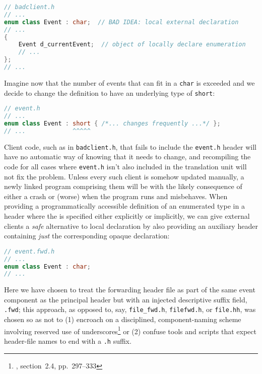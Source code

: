 \begin{lstlisting}[language=C++]
// badclient.h
// ...
enum class Event : char;  // BAD IDEA: local external declaration
// ...
{
    Event d_currentEvent;  // object of locally declare enumeration
    // ...
};
// ...
\end{lstlisting}

\noindent Imagine now that the number of events that can fit in a \lstinline!char! is
exceeded and we decide to change the definition to have an underlying
type of \lstinline!short!:

\begin{lstlisting}[language=C++]
// event.h
// ...
enum class Event : short { /*... changes frequently ...*/ };
// ...             ^^^^^
\end{lstlisting}

\noindent Client code, such as in \lstinline!badclient.h!, that fails to include the
\lstinline!event.h! header will have no automatic way of knowing that it
needs to change, and recompiling the code for all cases where
\lstinline!event.h! isn't also included in the translation unit will not
fix the problem. Unless every such client is somehow updated manually, a
newly linked program comprising them will be \romeogloss{IFNDR} with the likely
consequence of either a crash or (worse) when the program runs and
misbehaves. When providing a programmatically accessible definition of
an enumerated type in a header where the \romeogloss{underlying type} is
specified either explicitly or implicitly, we can give external
clients a \emph{safe} alternative to local declaration by also providing
an auxiliary header containing \emph{just} the corresponding opaque
declaration:

\begin{lstlisting}[language=C++]
// event.fwd.h
// ...
enum class Event : char;
// ...
\end{lstlisting}

\noindent Here we have chosen to treat the forwarding header file as part of the same event component as the principal header but with an injected descriptive suffix field, \lstinline!.fwd!; this approach, as opposed to, say, \lstinline!file_fwd.h!, \lstinline!filefwd.h!, or \lstinline!file.hh!, was chosen so as not to (1) encroach on a disciplined, component-naming scheme involving reserved use of underscores\footnote{\cite{lakos20}, section~2.4, pp.~297--333} or (2) confuse tools and scripts that expect header-file names to end with a \lstinline!.h! suffix.

